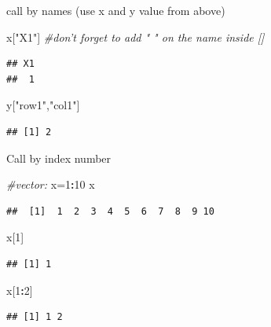 \documentclass[]{article}
\newenvironment{Shaded}{\begin{snugshade}}{\end{snugshade}}
\newcommand{\CommentTok}[1]{\textcolor[rgb]{0.56,0.35,0.01}{\textit{#1}}}
\newcommand{\DecValTok}[1]{\textcolor[rgb]{0.00,0.00,0.81}{#1}}
\newcommand{\NormalTok}[1]{#1}
\newcommand{\OperatorTok}[1]{\textcolor[rgb]{0.81,0.36,0.00}{\textbf{#1}}}
\newcommand{\StringTok}[1]{\textcolor[rgb]{0.31,0.60,0.02}{#1}}
\begin{document}
call by names (use x and y value from above)

\begin{Shaded}
\begin{Highlighting}[]
\NormalTok{x[}\StringTok{"X1"}\NormalTok{] }\CommentTok{#don't forget to add " " on the name inside []}
\end{Highlighting}
\end{Shaded}

\begin{verbatim}
## X1 
##  1
\end{verbatim}

\begin{Shaded}
\begin{Highlighting}[]
\NormalTok{y[}\StringTok{"row1"}\NormalTok{,}\StringTok{"col1"}\NormalTok{]}
\end{Highlighting}
\end{Shaded}

\begin{verbatim}
## [1] 2
\end{verbatim}

Call by index number

\begin{Shaded}
\begin{Highlighting}[]
\CommentTok{#vector:}
\NormalTok{x=}\DecValTok{1}\OperatorTok{:}\DecValTok{10}
\NormalTok{x}
\end{Highlighting}
\end{Shaded}

\begin{verbatim}
##  [1]  1  2  3  4  5  6  7  8  9 10
\end{verbatim}

\begin{Shaded}
\begin{Highlighting}[]
\NormalTok{x[}\DecValTok{1}\NormalTok{]}
\end{Highlighting}
\end{Shaded}

\begin{verbatim}
## [1] 1
\end{verbatim}

\begin{Shaded}
\begin{Highlighting}[]
\NormalTok{x[}\DecValTok{1}\OperatorTok{:}\DecValTok{2}\NormalTok{]}
\end{Highlighting}
\end{Shaded}

\begin{verbatim}
## [1] 1 2
\end{verbatim}
\end{document}
